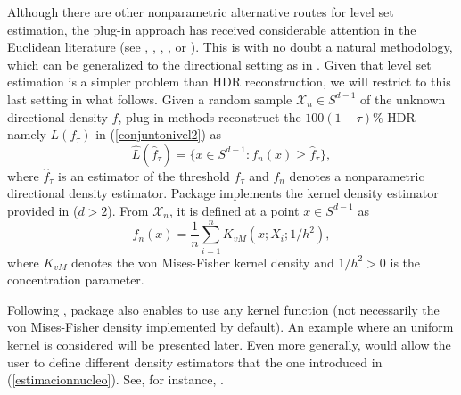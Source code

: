 Although there are other nonparametric alternative routes for level set estimation, the plug-in approach has received considerable attention in the Euclidean literature (see \citealp{tsybakov1997nonparametric}, \citealp{baillo2003total}, \citealp{mason2009asymptotic}, \citealp{rigollet2009optimal}, \citealp{mammen2013confidence} or \citealp{chen2017density}). This is with no doubt a natural methodology, which can be generalized to the directional setting as in \cite{saavedra2020nonparametric}. Given that level set estimation is a simpler problem than HDR reconstruction, we will restrict to this last setting in what follows. Given a random sample $\mathcal{X}_n\in S^{d-1}$ of the unknown directional density $f$, plug-in methods reconstruct the $100(1 - \tau)$\% HDR namely $L(f_\tau)$  in (\ref{conjuntonivel2}) as
\begin{equation}\label{Ltauest}
\hat{L}(\hat{f}_\tau)=\{x\in S^{d-1}:f_n(x)\geq \hat{f}_\tau\},
\end{equation}where $\hat{f}_\tau$ is an estimator of the threshold $ f_\tau$ and $f_n$ denotes a nonparametric directional density estimator. Package  implements the kernel density estimator provided in \cite{bai1989kernel} ($d>2$). From $\mathcal{X}_n$, it is defined at a point $x\in S^{d-1}$ as 
\begin{equation}
\label{estimacionnucleo}
f_n(x)= \frac{1}{n}  \sum_{i=1}^n K_{vM}(x;X_i;1/h^2),
\end{equation}where $K_{vM}$ denotes the von Mises-Fisher kernel density and $1/h^2 > 0$ is the concentration parameter.  

Following \cite{bai1989kernel}, package  also enables to use any kernel function (not necessarily the von Mises-Fisher density implemented by default). An example where an uniform kernel is considered will be presented later. Even more generally,  would allow the user to define different density estimators that the one introduced in (\ref{estimacionnucleo}). See, for instance, \cite{pelletier2005kernel}. 

